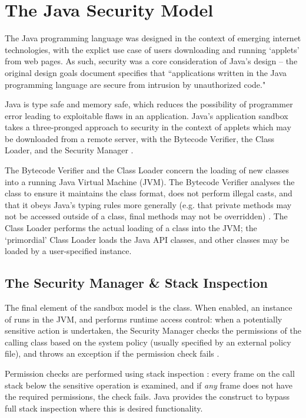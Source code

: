 \section{The Java Security Model}

The Java programming language was designed in the context of emerging internet technologies, with the explict use case of users downloading and running `applets' from web pages. As such, security was a core consideration of Java's design -- the original design goals document \cite{javadesignprinciples} specifies that ``applications written in the Java programming language are secure from intrusion by unauthorized code."

Java is type safe and memory safe, which reduces the possibility of programmer error leading to exploitable flaws in an application. Java's application sandbox takes a three-pronged approach to security in the context of applets which may be downloaded from a remote server, with the Bytecode Verifier, the Class Loader, and the Security Manager \cite{mcgraw1999securingjava}.

The Bytecode Verifier and the Class Loader concern the loading of new classes into a running Java Virtual Machine (JVM). The Bytecode Verifier analyses the class to ensure it maintains the class format, does not perform illegal casts, and that it obeys Java's typing rules more generally (e.g. that private methods may not be accessed outside of a class, final methods may not be overridden) \cite{lindholm2014java}. The Class Loader performs the actual loading of a class into the JVM; the `primordial' Class Loader \cite{mcgraw1999securingjava} loads the Java API classes, and other classes may be loaded by a user-specified  instance.

\subsection{The Security Manager \& Stack Inspection}

The final element of the sandbox model is the  class. When enabled, an instance of  runs in the JVM, and performs runtime access control: when a potentially sensitive action is undertaken, the Security Manager checks the permissions of the calling class based on the system policy (usually specified by an external policy file), and throws an exception if the permission check fails \cite{gosling2014java}.

Permission checks are performed using stack inspection \cite{gong2003javasecurity}: every frame on the call stack below the sensitive operation is examined, and if \textit{any} frame does not have the required permissions, the check fails. Java provides the  construct to bypass full stack inspection \cite{gong2003javasecurity} where this is desired functionality.

